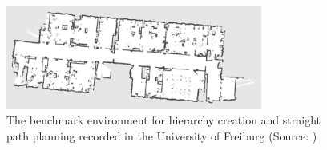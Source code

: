\begin{figure}[h]
    \centering
    \includegraphics[width=0.75\textwidth]{figures/30_methods/freiburg_benchmark.png}
    \caption[The benchmark environment for hierarchy creation and straight path planning]{The benchmark environment for hierarchy creation and straight path planning recorded in the University of Freiburg (Source: \cite{cyrill_stachniss_robotics_2015})}
    \label{fig:freiburg_benchmark}
\end{figure}

